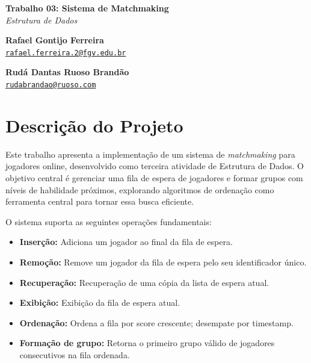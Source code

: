 \documentclass[11pt,a4paper]{article}
\begin{document}
\onehalfspacing
\begin{center}
    \vspace*{0.5cm}
    {\LARGE \textbf{Trabalho 03: Sistema de Matchmaking}} \\
    \textit{Estrutura de Dados} \\
    \vspace{0.8cm}

    \begin{minipage}{0.45\textwidth}
        \centering
        \textbf{Rafael Gontijo Ferreira} \\
        \href{mailto:rafael.ferreira.2@fgv.edu.br}{\footnotesize \texttt{rafael.ferreira.2@fgv.edu.br}}
    \end{minipage}
    \begin{minipage}{0.45\textwidth}
        \centering
        \textbf{Rudá Dantas Ruoso Brandão} \\
        \href{mailto:rudabrandao@ruoso.com}{\footnotesize \texttt{rudabrandao@ruoso.com}}
    \end{minipage}
    
    \vspace{0.8cm}
\end{center}

\section{Descrição do Projeto}
 
Este trabalho apresenta a implementação de um sistema de \textit{matchmaking} para jogadores online, desenvolvido como terceira atividade de Estrutura de Dados. O objetivo central é gerenciar uma fila de espera de jogadores e formar grupos com níveis de habilidade próximos, explorando algoritmos de ordenação como ferramenta central para tornar essa busca eficiente.
 
O sistema suporta as seguintes operações fundamentais:
 
\begin{itemize}
    \item \textbf{Inserção:} Adiciona um jogador ao final da fila de espera.
    \item \textbf{Remoção:} Remove um jogador da fila de espera  pelo seu identificador único.
    \item \textbf{Recuperação:} Recuperação de uma cópia da lista de espera atual.
    \item \textbf{Exibição:} Exibição da fila de espera atual.
    \item \textbf{Ordenação:} Ordena a fila por score crescente; desempate por timestamp.
    \item \textbf{Formação de grupo:} Retorna o primeiro grupo válido de jogadores consecutivos na fila ordenada.
\end{itemize}
 
\end{document}
